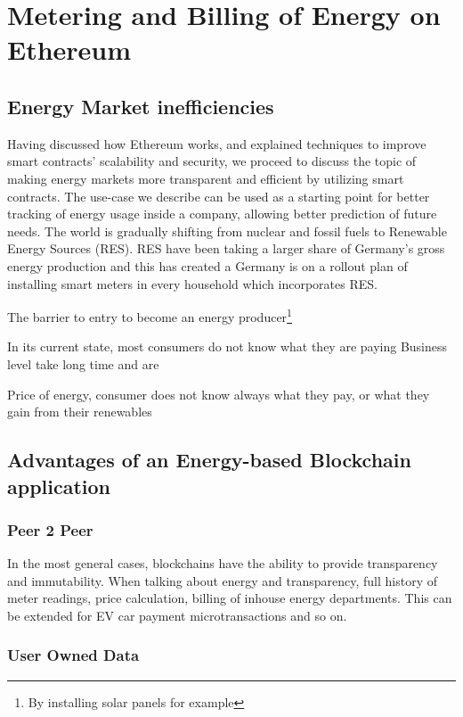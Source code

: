 \chapter{Metering and Billing of Energy on Ethereum}\label{ch:implementation}

\section{Energy Market inefficiencies}

Having discussed how Ethereum works, and explained techniques to improve smart contracts' scalability and security, we proceed to discuss the topic of making energy markets more transparent and efficient by utilizing smart contracts. The use-case we describe can be used as a starting point for better tracking of energy usage inside a company, allowing better prediction of future needs.  
The world is gradually shifting from nuclear and fossil fuels to Renewable Energy Sources (RES). RES have been taking a larger share of Germany's gross energy production and this has created a 
Germany is on a rollout plan of installing smart meters in every household which incorporates RES.  

The barrier to entry to become an energy producer\footnote{By installing solar panels for example} 

In its current state, most consumers do not know what they are paying Business level take long time and are 

Price of energy, consumer does not know always what they pay, or what they gain from their renewables
 
\section{Advantages of an Energy-based Blockchain application}

\subsection{Peer 2 Peer}
In the most general cases, blockchains have the ability to provide transparency and immutability. When talking about energy and transparency, full history of meter readings, price calculation, billing of inhouse energy departments. This can be extended for EV car payment microtransactions and so on.

\subsection{User Owned Data}

